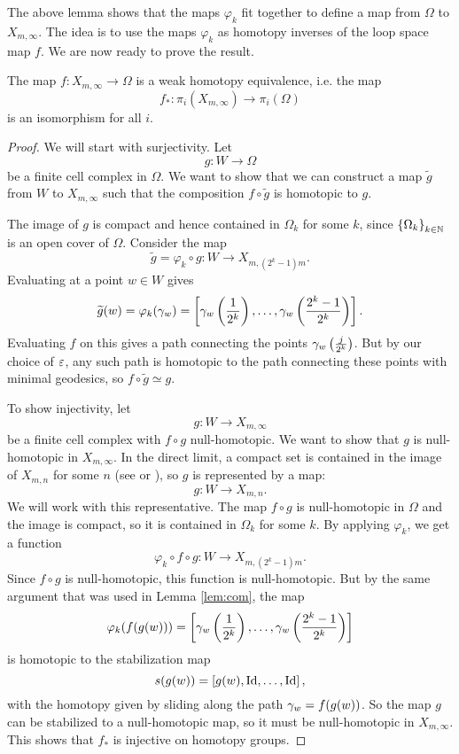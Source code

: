 The above lemma shows that the maps $\varphi_k$ fit together to define
a map from $\Omega$ to $X_{m,\infty}$.
The idea is to use the maps $\varphi_k$ as homotopy inverses of the
loop space map $f$. We are now ready to prove the result.

\begin{theorem}
  The map $f : X_{m,\infty} \to \Omega$ is a weak homotopy
  equivalence, i.e. the map
  \[f_* : \pi_i(X_{m,\infty}) \to \pi_i(\Omega)\]
  is an isomorphism for all $i$.
\end{theorem}


\begin{proof}
  We will start with surjectivity. Let
  \[ g : W \to \Omega \]
  be a finite cell complex in $\Omega$. We want to show that we can
  construct a map $\widetilde g$ from $W$ to $X_{m,\infty}$ such that
  the composition $f\circ \widetilde g$ is homotopic to $g$.
  
  The image of $g$ is compact and hence contained in $\Omega_k$ for
  some $k$, since $\left\{ \Omega_k \right\}_{k\in\mathbb{N}}$ is an open cover of
  $\Omega$. Consider the map 
  \[ \widetilde g = \varphi_k\circ g : W \to X_{m,(2^k-1)m}. \]
  Evaluating at a point $w\in W$ gives
  \[ \widetilde g(w) = \varphi_k(\gamma_w) = \left[
    \gamma_w\left(\frac{1}{2^k}\right),\dots,
    \gamma_w\left(\frac{2^k-1}{2^k}\right) \right]. \]
  Evaluating $f$ on this gives a path connecting the points
  $\gamma_w\left(\frac{j}{2^k}\right)$. But by our choice of $\varepsilon$, any
  such path is homotopic to the path connecting these points with
  minimal geodesics, so $f\circ\widetilde g \simeq g$.

  To show injectivity, let
  \[ g : W \to X_{m,\infty}\]
  be a finite cell complex with $f\circ g$ null-homotopic. We want to
  show that $g$ is null-homotopic in $X_{m,\infty}$. In the
  direct limit, a compact set is contained in the image of $X_{m,n}$
  for some $n$ (see \cite[Proposition~A.1]{hatcher} or
  \cite[Chapter~9.4]{may}), so $g$ is represented by a map:
  \[ g : W \to X_{m,n}. \]
  We will work with this representative. The map $f\circ
  g$ is null-homotopic in $\Omega$ and the image is compact, so it is
  contained in $\Omega_k$ for some $k$. By applying $\varphi_k$, we
  get a function
  \[ \varphi_k\circ f\circ g : W \to X_{m,(2^k-1)m}. \]
  Since $f\circ g$ is null-homotopic, this function is
  null-homotopic. But by the same argument that was used in
  Lemma \ref{lem:com}, the map
  \[ \varphi_k(f(g(w))) = \left[
    \gamma_w\left(\frac{1}{2^k}\right),\dots,\gamma_w\left(\frac{2^k-1}{2^k}
    \right)\right] \] 
  is homotopic to the stabilization map
  \[ s(g(w)) = \left[g(w),\operatorname{Id},\dots,\operatorname{Id}\right], \]
  with the homotopy given by sliding along the path $\gamma_w=f(g(w))$.
  So the map $g$ can be stabilized to a null-homotopic map, so it must
  be null-homotopic in $X_{m,\infty}$. This shows that $f_*$ is
  injective on homotopy groups.
\end{proof}

